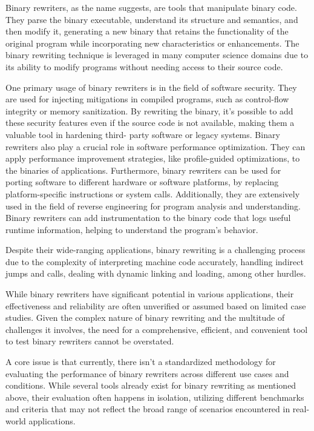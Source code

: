 \documentclass[a4paper,11pt,oneside]{report}
\begin{document}
Binary rewriters, as the name suggests, are tools that manipulate binary code. They
parse the binary executable, understand its structure and semantics, and then modify it,
generating a new binary that retains the functionality of the original program while
incorporating new characteristics or enhancements. The binary rewriting technique is
leveraged in many computer science domains due to its ability to modify programs without
needing access to their source code.

One primary usage of binary rewriters is in the field of software security. They are
used for injecting mitigations in compiled programs, such as control-flow integrity or
memory sanitization. By rewriting the binary, it's possible to add these security features
even if the source code is not available, making them a valuable tool in hardening third-
party software or legacy systems. Binary rewriters also play a crucial role in software
performance optimization. They can apply performance improvement strategies, like
profile-guided optimizations, to the binaries of applications. Furthermore, binary rewriters
can be used for porting software to different hardware or software platforms, by replacing
platform-specific instructions or system calls. Additionally, they are extensively used in the
field of reverse engineering for program analysis and understanding. Binary rewriters can
add instrumentation to the binary code that logs useful runtime information, helping to
understand the program's behavior.

Despite their wide-ranging applications, binary rewriting is a challenging process due
to the complexity of interpreting machine code accurately, handling indirect jumps and
calls, dealing with dynamic linking and loading, among other hurdles.

While binary rewriters have significant potential in various applications, their
effectiveness and reliability are often unverified or assumed based on limited case studies.
Given the complex nature of binary rewriting and the multitude of challenges it involves, the
need for a comprehensive, efficient, and convenient tool to test binary rewriters cannot be
overstated.

A core issue is that currently, there isn't a standardized methodology for evaluating
the performance of binary rewriters across different use cases and conditions. While several
tools already exist for binary rewriting as mentioned above, their evaluation often happens
in isolation, utilizing different benchmarks and criteria that may not reflect the broad range
of scenarios encountered in real-world applications.
\end{document}

